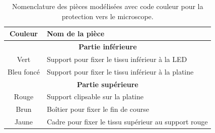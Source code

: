 \begin{table}[H]
    \centering
    \begin{tabular}{|c|l|}
        \hline
        \textbf{Couleur}                         & \textbf{Nom de la pièce}                             \\
        \hline
        \multicolumn{2}{|c|}{\textbf{Partie inférieure}}                                                \\
        \hline
        \textcolor[RGB]{70, 170, 70}{Vert}       & Support pour fixer le tissu inférieur à la LED       \\
        \textcolor[RGB]{30, 50, 150}{Bleu foncé} & Support pour fixer le tissu inférieur à la platine   \\
        \hline
        \multicolumn{2}{|c|}{\textbf{Partie supérieure}}                                                \\
        \hline
        \textcolor[RGB]{170, 50, 50}{Rouge}      & Support clipsable sur la platine                     \\
        \textcolor[RGB]{120, 70, 30}{Brun}       & Boîtier pour fixer le fin de course                  \\
        \textcolor[RGB]{233, 173, 56}{Jaune}     & Cadre pour fixer le tissu supérieur au support rouge \\
        \hline
    \end{tabular}
    \caption{Nomenclature des pièces modélisées avec code couleur pour la protection vers le microscope. \cite{chatgptTableProtectionVersMicroscope}}
    \label{tab:nomenclature_pieces_microscope}
\end{table}


